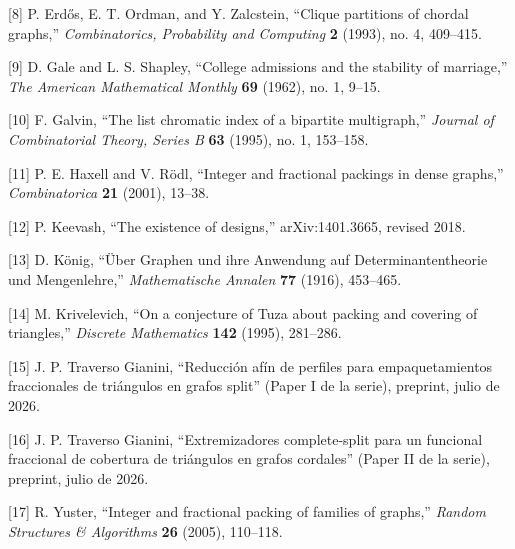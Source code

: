 \documentclass[spanish,11pt,a4paper]{article}
\begin{document}
{[}8{]} P. Erdős, E. T. Ordman, and Y. Zalcstein, ``Clique partitions of
chordal graphs,'' \emph{Combinatorics, Probability and Computing}
\textbf{2} (1993), no. 4, 409--415.

{[}9{]} D. Gale and L. S. Shapley, ``College admissions and the
stability of marriage,'' \emph{The American Mathematical Monthly}
\textbf{69} (1962), no. 1, 9--15.

{[}10{]} F. Galvin, ``The list chromatic index of a bipartite
multigraph,'' \emph{Journal of Combinatorial Theory, Series B}
\textbf{63} (1995), no. 1, 153--158.

{[}11{]} P. E. Haxell and V. Rödl, ``Integer and fractional packings in
dense graphs,'' \emph{Combinatorica} \textbf{21} (2001), 13--38.

{[}12{]} P. Keevash, ``The existence of designs,'' arXiv:1401.3665,
revised 2018.

{[}13{]} D. König, ``Über Graphen und ihre Anwendung auf
Determinantentheorie und Mengenlehre,'' \emph{Mathematische Annalen}
\textbf{77} (1916), 453--465.

{[}14{]} M. Krivelevich, ``On a conjecture of Tuza about packing and
covering of triangles,'' \emph{Discrete Mathematics} \textbf{142}
(1995), 281--286.

{[}15{]} J. P. Traverso Gianini, ``Reducción afín de perfiles para
empaquetamientos fraccionales de triángulos en grafos split'' (Paper I
de la serie), preprint, julio de 2026.

{[}16{]} J. P. Traverso Gianini, ``Extremizadores complete-split para un
funcional fraccional de cobertura de triángulos en grafos cordales''
(Paper II de la serie), preprint, julio de 2026.

{[}17{]} R. Yuster, ``Integer and fractional packing of families of
graphs,'' \emph{Random Structures \& Algorithms} \textbf{26} (2005),
110--118.
\end{document}
